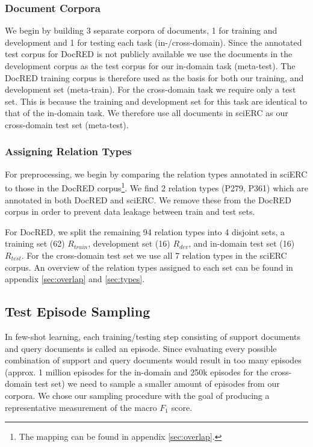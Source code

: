 \documentclass[11pt]{article}
\begin{document}
\subsubsection{Document Corpora}
We begin by building 3 separate corpora of documents, 1 for training and development and 1 for testing each task (in-/cross-domain). Since the annotated test corpus for DocRED is not publicly available we use the documents in the development corpus as the test corpus for our in-domain task (meta-test). The DocRED training corpus is therefore used as the basis for both our training, and development set (meta-train). For the cross-domain task we require only a test set. This is because the training and development set for this task are identical to that of the in-domain task. We therefore use all documents in sciERC as our cross-domain test set (meta-test).
\subsubsection{Assigning Relation Types}
For preprocessing, we begin by comparing the relation types annotated in sciERC to those in the DocRED corpus\footnote{The mapping can be found in appendix \ref{sec:overlap}.}.
We find 2 relation types (P279, P361) which are annotated in both DocRED and sciERC. 
We remove these from the DocRED corpus in order to prevent data leakage between train and test sets. 

For DocRED, we split the remaining 94 relation types into 4 disjoint sets, a training set (62) $R_{train}$, development set (16) $R_{dev}$, and in-domain test set (16) $R_{test}$. 
For the cross-domain test set we use all 7 relation types in the sciERC corpus. 
An overview of the relation types assigned to each set can be found in appendix \ref{sec:overlap} and \ref{sec:types}.





\subsection{Test Episode Sampling}
In few-shot learning, each training/testing step consisting of support documents and query documents is called an episode.
Since evaluating every possible combination of support and query documents would result in too many episodes (approx. 1 million episodes for the in-domain and 250k episodes for the cross-domain test set) we need to sample a smaller amount of episodes from our corpora. 
We chose our sampling procedure with the goal of producing a representative measurement of the macro $F_1$ score.
\end{document}
